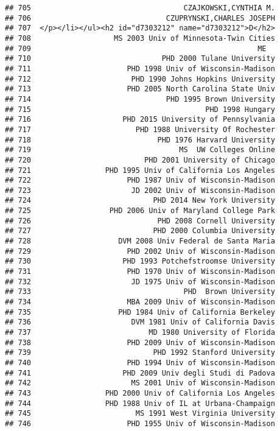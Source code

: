 \documentclass[
]{article}
\begin{document}
\begin{verbatim}
## 705                                   CZAJKOWSKI,CYNTHIA M.
## 706                               CZUPRYNSKI,CHARLES JOSEPH
## 707  </p></li></ul><h2 id="d7303212" name="d7303212">D</h2>
## 708                   MS 2003 Univ of Minnesota-Twin Cities
## 709                                                    ME  
## 710                              PHD 2000 Tulane University
## 711                      PHD 1998 Univ of Wisconsin-Madison
## 712                       PHD 1990 Johns Hopkins University
## 713                      PHD 2005 North Carolina State Univ
## 714                               PHD 1995 Brown University
## 715                                        PHD 1998 Hungary
## 716                     PHD 2015 University of Pennsylvania
## 717                        PHD 1988 University Of Rochester
## 718                             PHD 1976 Harvard University
## 719                                  MS  UW Colleges Online
## 720                          PHD 2001 University of Chicago
## 721                 PHD 1995 Univ of California Los Angeles
## 722                      PHD 1987 Univ of Wisconsin-Madison
## 723                       JD 2002 Univ of Wisconsin-Madison
## 724                            PHD 2014 New York University
## 725                  PHD 2006 Univ of Maryland College Park
## 726                             PHD 2008 Cornell University
## 727                            PHD 2000 Columbia University
## 728                    DVM 2008 Univ Federal de Santa Maria
## 729                      PHD 2002 Univ of Wisconsin-Madison
## 730                     PHD 1993 Potchefstroomse University
## 731                      PHD 1970 Univ of Wisconsin-Madison
## 732                       JD 1975 Univ of Wisconsin-Madison
## 733                                   PHD  Brown University
## 734                      MBA 2009 Univ of Wisconsin-Madison
## 735                    PHD 1984 Univ of California Berkeley
## 736                       DVM 1981 Univ of California Davis
## 737                           MD 1980 University of Florida
## 738                      PHD 2009 Univ of Wisconsin-Madison
## 739                            PHD 1992 Stanford University
## 740                      PHD 1994 Univ of Wisconsin-Madison
## 741                     PHD 2009 Univ degli Studi di Padova
## 742                       MS 2001 Univ of Wisconsin-Madison
## 743                 PHD 2000 Univ of California Los Angeles
## 744                 PHD 1988 Univ of IL at Urbana-Champaign
## 745                        MS 1991 West Virginia University
## 746                      PHD 1955 Univ of Wisconsin-Madison

\end{verbatim}
\end{document}
